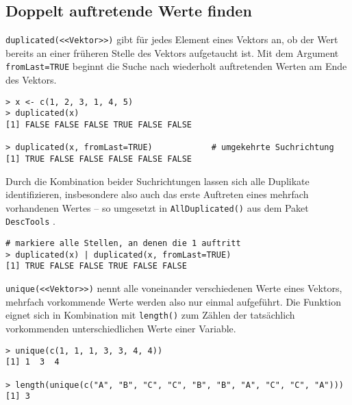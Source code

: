 \subsection{Doppelt auftretende Werte finden}
\label{sec:unique}

\lstinline!duplicated(<<Vektor>>)! gibt für jedes Element eines Vektors an, ob der Wert bereits an einer früheren Stelle des Vektors aufgetaucht ist. Mit dem Argument \lstinline!fromLast=TRUE! beginnt die Suche nach wiederholt auftretenden Werten am Ende des Vektors.
\begin{lstlisting}
> x <- c(1, 2, 3, 1, 4, 5)
> duplicated(x)
[1] FALSE FALSE FALSE TRUE FALSE FALSE

> duplicated(x, fromLast=TRUE)            # umgekehrte Suchrichtung
[1] TRUE FALSE FALSE FALSE FALSE FALSE
\end{lstlisting}

Durch die Kombination beider Suchrichtungen lassen sich alle Duplikate identifizieren, insbesondere also auch das erste Auftreten eines mehrfach vorhandenen Wertes -- so umgesetzt in  \lstinline!AllDuplicated()! aus dem Paket \lstinline!DescTools! \cite{Signorell2014}.
\begin{lstlisting}
# markiere alle Stellen, an denen die 1 auftritt
> duplicated(x) | duplicated(x, fromLast=TRUE)
[1] TRUE FALSE FALSE TRUE FALSE FALSE
\end{lstlisting}

\lstinline!unique(<<Vektor>>)! nennt alle voneinander verschiedenen Werte eines Vektors, mehrfach vorkommende Werte werden also nur einmal aufgeführt. Die Funktion eignet sich in Kombination mit \lstinline!length()! zum Zählen der tatsächlich vorkommenden unterschiedlichen Werte einer Variable.
\begin{lstlisting}
> unique(c(1, 1, 1, 3, 3, 4, 4))
[1] 1  3  4

> length(unique(c("A", "B", "C", "C", "B", "B", "A", "C", "C", "A")))
[1] 3
\end{lstlisting}

